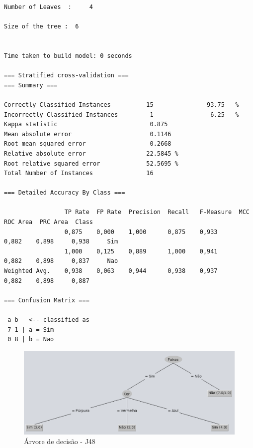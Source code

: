 \documentclass[
    article,            %
    11pt,               %
    oneside,            %
    a4paper,            %
    english,            %
    brazil,             %
    sumario=tradicional,
    ]{abntex2}
\begin{document}
\begin{itemize}
\begin{Verbatim}[frame=single, fontsize=\tiny]
Number of Leaves  :     4

Size of the tree :  6


Time taken to build model: 0 seconds

=== Stratified cross-validation ===
=== Summary ===

Correctly Classified Instances          15               93.75   %
Incorrectly Classified Instances         1                6.25   %
Kappa statistic                          0.875 
Mean absolute error                      0.1146
Root mean squared error                  0.2668
Relative absolute error                 22.5845 %
Root relative squared error             52.5695 %
Total Number of Instances               16     

=== Detailed Accuracy By Class ===

                 TP Rate  FP Rate  Precision  Recall   F-Measure  MCC      ROC Area  PRC Area  Class
                 0,875    0,000    1,000      0,875    0,933      0,882    0,898     0,938     Sim
                 1,000    0,125    0,889      1,000    0,941      0,882    0,898     0,837     Nao
Weighted Avg.    0,938    0,063    0,944      0,938    0,937      0,882    0,898     0,887     

=== Confusion Matrix ===

 a b   <-- classified as
 7 1 | a = Sim
 0 8 | b = Nao
\end{Verbatim}

\begin{minipage}{\linewidth}
    \centering
    \begin{figure}[H]
        \label{j48-decision-tree}
        \caption{Árvore de decisão - J48}
        \includegraphics[width=\textwidth]{imgs/exer2-j48-tree.pdf}
    \end{figure}
\end{minipage}

\end{itemize}
\end{document}
